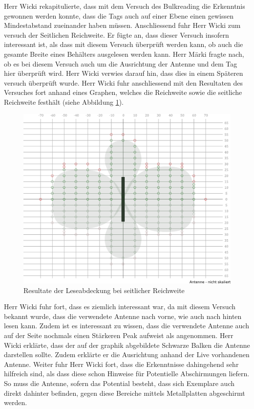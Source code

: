 \documentclass[parskip=full, a4paper]{scrreprt}
\begin{document}
Herr Wicki rekapitulierte, dass mit dem Versuch des Bulkreading die Erkenntnis gewonnen werden konnte, dass die Tags auch auf einer Ebene einen gewissen Mindestabstand zueinander haben müssen.
Anschliessend fuhr Herr Wicki zum versuch der Seitlichen Reichweite. Er fügte an, dass dieser Versuch insofern interessant ist, als dass mit diesem Versuch überprüft werden kann, ob auch die gesamte Breite eines Behälters ausgelesen werden kann.
Herr Märki fragte nach, ob es bei diesem Versuch auch um die Ausrichtung der Antenne und dem Tag hier überprüft wird. Herr Wicki verwies darauf hin, dass dies in einem Späteren versuch überprüft wurde.
Herr Wicki fuhr anschliessend mit den Resultaten des Versuches fort anhand eines Graphen, welches die Reichweite sowie die seitliche Reichweite festhält (siehe Abbildung \ref{fig:abdeckungSeitlicheReichweite}).
\begin{figure}[htb]
	\centering
	\includegraphics[keepaspectratio,width=\linewidth]{img/seitlicheReichweiteVersuch}
	\caption{Resultate der Leseabdeckung bei seitlicher Reichweite}
	\label{fig:abdeckungSeitlicheReichweite}
\end{figure}
Herr Wicki fuhr fort, dass es ziemlich interessant war, da mit diesem Versuch bekannt wurde, dass die verwendete Antenne nach vorne, wie auch nach hinten lesen kann. Zudem ist es interessant zu wissen, dass die verwendete Antenne auch auf der Seite nochmals einen Stärkeren Peak aufweist als angenommen. Herr Wicki erklärte, dass der auf der graphik abgebildete Schwarze Balken die Antenne darstellen sollte. Zudem erklärte er die Ausrichtung anhand der Live vorhandenen Antenne.
Weiter fuhr Herr Wicki fort, dass die Erkenntnisse dahingehend sehr hilfreich sind, als dass diese schon Hinweise für Potentielle Abschirmungen liefern.
So muss die Antenne, sofern das Potential besteht, dass sich Exemplare auch direkt dahinter befinden, gegen diese Bereiche mittels Metallplatten abgeschirmt werden. 
\end{document}
